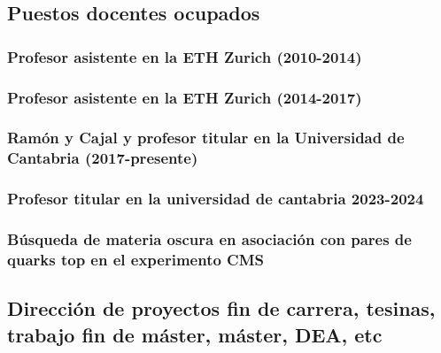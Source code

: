\documentclass[a4paper, 11pt, twoside, openright]{report}
\begin{document}
\subsection{Puestos docentes ocupados}

\subsubsection{Profesor asistente en la ETH Zurich (2010-2014)}
%

\subsubsection{Profesor asistente en la ETH Zurich (2014-2017)}
%

\subsubsection{Ramón y Cajal y profesor titular en la Universidad de Cantabria (2017-presente)}
%

\subsubsection{Profesor titular en la universidad de cantabria 2023-2024}
%

\subsubsection{Búsqueda de materia oscura en asociación con pares de quarks top en el experimento CMS}


\subsection{Dirección de proyectos fin de carrera, tesinas, trabajo fin de máster, máster, DEA, etc}
\end{document}
